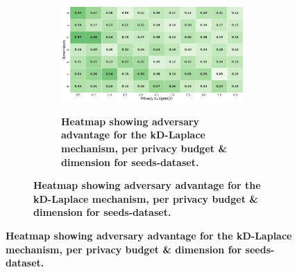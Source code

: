 \begin{figure}[H]
  \centering
  \begin{subfigure}[b]{0.9\textwidth}
    \begin{subfigure}[c]{1\textwidth}
      \caption{\textbf{Heatmap showing adversary advantage for the kD-Laplace mechanism, per privacy budget \& dimension for seeds-dataset.}}
      \includegraphics[width=1\textwidth]{Results/kd-laplace/kd-Laplace/seeds-dataset/shokri_mi_adv.png}
      \label{fig:privacy_seeds-dataset_adversial_advantage_kd-laplace}
    \end{subfigure}
    \vfill %


\end{subfigure}
\end{figure}
